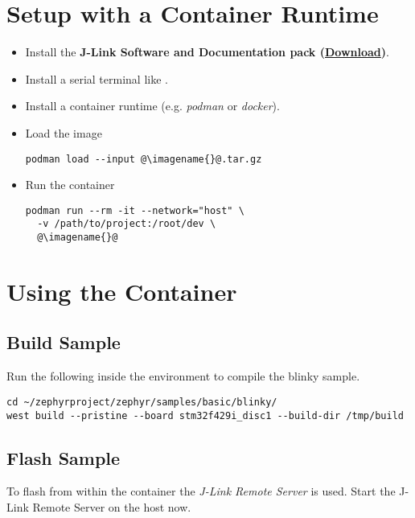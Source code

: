 \newpage

\section{Setup with a Container Runtime}


\begin{itemize}
  \item Install the \textbf{J-Link Software and Documentation pack
          (\href{https://www.segger.com/downloads/jlink}{Download})}.
  \item Install a serial terminal like .
  \item Install a container runtime (e.g. \emph{podman} or \emph{docker}).
  \item Load the image
        \begin{lstlisting}
podman load --input @\imagename{}@.tar.gz
\end{lstlisting}
  \item Run the container
        \begin{lstlisting}
podman run --rm -it --network="host" \
  -v /path/to/project:/root/dev \
  @\imagename{}@
\end{lstlisting}
\end{itemize}

\newpage

\section{Using the Container}

\subsection{Build Sample}

Run the following inside the environment to compile the blinky sample.

\begin{lstlisting}
cd ~/zephyrproject/zephyr/samples/basic/blinky/
west build --pristine --board stm32f429i_disc1 --build-dir /tmp/build
\end{lstlisting}

\subsection{Flash Sample}

To flash from within the container the \emph{J-Link Remote Server} is used.
Start the J-Link Remote Server on the host now.

